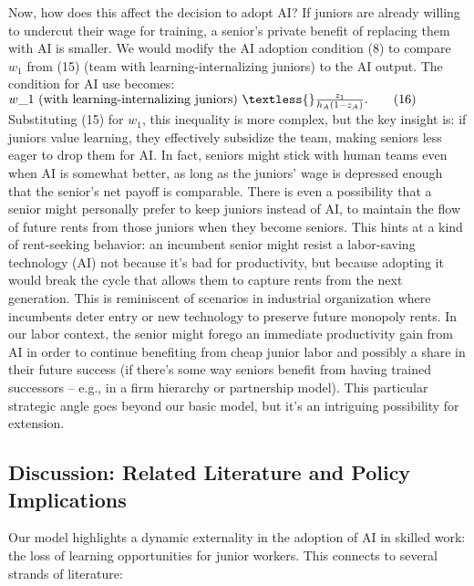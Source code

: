 \documentclass[12pt]{article}
\begin{document}
Now, how does this affect the decision to adopt AI? If juniors are
already willing to undercut their wage for training, a senior's private
benefit of replacing them with AI is smaller. We would modify the
{AI adoption condition} (8) to compare \(w_1\) from (15) (team
with learning-internalizing juniors) to the AI output. The condition for
AI use becomes: $ w\_1 \text{ (with learning-internalizing juniors) }
\textless{} \frac{z_1}{h_A(1-z_A)}. \tag{16}$ Substituting (15) for
\(w_1\), this inequality is more complex, but the key insight is:
{if juniors value learning, they effectively subsidize the team,
making seniors less eager to drop them for AI}. In fact, seniors might
stick with human teams even when AI is somewhat better, as long as the
juniors' wage is depressed enough that the senior's net payoff is
comparable. There is even a possibility that a {senior might
{personally prefer} to keep juniors instead of AI}, to maintain the
flow of future rents from those juniors when they become seniors. This
hints at a kind of {rent-seeking behavior}: an incumbent senior
might resist a labor-saving technology (AI) not because it's bad for
productivity, but because adopting it would break the cycle that allows
them to capture rents from the next generation. This is reminiscent of
scenarios in industrial organization where incumbents deter entry or new
technology to preserve future monopoly rents. In our labor context, the
senior might forego an immediate productivity gain from AI in order to
continue benefiting from cheap junior labor and possibly a share in
their future success (if there's some way seniors benefit from having
trained successors -- e.g., in a firm hierarchy or partnership model).
This particular strategic angle goes beyond our basic model, but it's an
intriguing possibility for extension.

\subsection{Discussion: Related Literature and Policy
Implications}\label{discussion-related-literature-and-policy-implications}

Our model highlights a {dynamic externality} in the adoption of
AI in skilled work: the loss of learning opportunities for junior
workers. This connects to several strands of literature:
\end{document}
